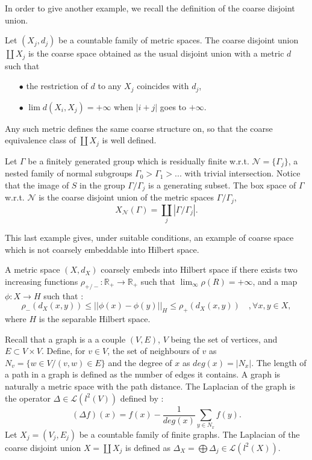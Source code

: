 
In order to give another example, we recall the definition of the coarse disjoint union.

\begin{definition}
Let $(X_j,d_j)$ be a countable family of metric spaces. The coarse disjoint union $\coprod X_j$ is the coarse space obtained as the usual disjoint union with a metric $d$ such that 
\begin{itemize}
\item[$\bullet$] the restriction of $d$ to any $X_j$ coincides with $d_j$, 
\item[$\bullet$] $\lim d(X_i,X_j)= + \infty$ when $|i+j|$ goes to $+\infty$.
\end{itemize}
Any such metric defines the same coarse structure on, so that the coarse equivalence class of $\coprod X_j$ is well defined. 
\end{definition}

\begin{Expl}
Let $\Gamma$ be a finitely generated group which is residually finite w.r.t. $\mathcal N=\{\Gamma_j\}$, a nested family of normal subgroups $\Gamma_0 > \Gamma_1>...$ with trivial intersection. Notice that the image of $S$ in the group $\Gamma / \Gamma_j$ is a generating subset. The box space of $\Gamma$ w.r.t. $\mathcal N$ is the coarse disjoint union of the metric spaces $\Gamma/\Gamma_j$,
\[X_{\mathcal N}(\Gamma)=\coprod_j |\Gamma/\Gamma_j|.\]
\end{Expl}

This last example gives, under suitable conditions, an example of coarse space which is not coarsely embeddable into Hilbert space.

\begin{definition}
A metric space $(X,d_X)$ coarsely embeds into Hilbert space if there exists two increasing functions $\rho_{+/-}: \mathbb R_+\rightarrow \mathbb R_+$ such that $\lim_{\infty} \rho(R) = +\infty$, and a map $\phi : X\rightarrow H$ such that :
\[\rho_-(d_X(x,y))\leq ||\phi(x)-\phi(y)||_H \leq \rho_+(d_X(x,y))\quad,\forall x,y\in X,\]
where $H$ is the separable Hilbert space.\\
\end{definition}

Recall that a graph is a a couple $(V,E)$, $V$ being the set of vertices, and $E\subset V\times V$. Define, for $v\in V$, the set of neighbours of $v$ as $N_v=\{w\in V / (v,w)\in E\}$ and the degree of $x$ as $deg(x)=|N_x|$. The length of a path in a graph is defined as the number of edges it contains. A graph is naturally a metric space with the path distance. The Laplacian of the graph is the operator $\Delta \in\mathcal L(l^2(V))$ defined by :
\[(\Delta f) (x) = f(x) - \frac{1}{deg(x)}\sum_{y\in N_x} f(y) .\] 
Let $X_j = (V_j,E_j)$ be a countable family of finite graphs. The Laplacian of the coarse disjoint union $X=\coprod X_j$ is defined as $\Delta_X = \bigoplus \Delta_j \in \mathcal L(l^2(X))$.
 
